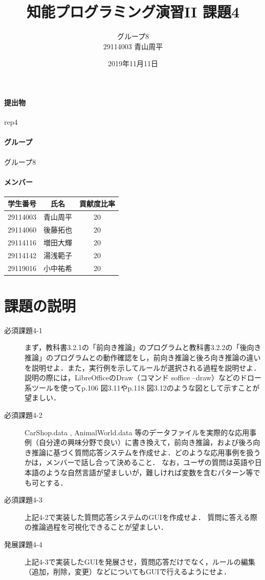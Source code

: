\documentclass[12pt]{jarticle}
\title{知能プログラミング演習II 課題4}
\author{グループ8\\
  29114003 青山周平\\
}
\date{2019年11月11日}
\begin{document}
\maketitle

\paragraph{提出物} rep4
\paragraph{グループ} グループ8
\paragraph{メンバー}
\begin{tabular}{|c|c|c|}
  \hline
  学生番号&氏名&貢献度比率\\
  \hline\hline
  29114003&青山周平&20\\
  \hline
  29114060&後藤拓也&20\\
  \hline
  29114116&増田大輝&20\\
  \hline
  29114142&湯浅範子&20\\
  \hline
  29119016&小中祐希&20\\
  \hline
\end{tabular}



\section{課題の説明}
\begin{description}
\item[必須課題4-1] まず，教科書3.2.1の「前向き推論」のプログラムと教科書3.2.2の「後向き推論」のプログラムとの動作確認をし，前向き推論と後ろ向き推論の違いを説明せよ．また，実行例を示してルールが選択される過程を説明せよ．説明の際には，LibreOfficeのDraw（コマンド soffice --draw）などのドロー系ツールを使ってp.106 図3.11やp.118 図3.12のような図として示すことが望ましい．
\item[必須課題4-2] CarShop.data , AnimalWorld.data 等のデータファイルを実際的な応用事例（自分達の興味分野で良い）に書き換えて，前向き推論，および後ろ向き推論に基づく質問応答システムを作成せよ．どのような応用事例を扱うかは，メンバーで話し合って決めること．
なお，ユーザの質問は英語や日本語のような自然言語が望ましいが，難しければ変数を含むパターン等でも可とする．
\item[必須課題4-3] 上記4-2で実装した質問応答システムのGUIを作成せよ．
質問に答える際の推論過程を可視化できることが望ましい．
\item[発展課題4-4] 上記4-3で実装したGUIを発展させ，質問応答だけでなく，ルールの編集（追加，削除，変更）などについてもGUIで行えるようにせよ．
\end{description}
\end{document}
